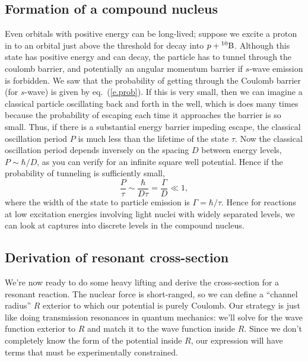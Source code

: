 \subsection{Formation of a compound nucleus}
Even orbitals with positive energy can be long-lived; suppose we excite a proton in \carbon[11] to an orbital just above the threshold for decay into $\pt + \boron[10]$.  Although this state has positive energy and can decay, the particle has to tunnel through the coulomb barrier, and potentially an angular momentum barrier if $s$-wave emission is forbidden.  We saw that the probability of getting through the Coulomb barrier (for $s$-wave) is given by eq.~(\ref{e.prob}).  If this is very small, then we can imagine a classical particle oscillating back and forth in the well, which is does many times because the probability of escaping each time it approaches the barrier is so small. Thus, if there is a substantial energy barrier impeding escape, the classical oscillation period $P$ is much less than the lifetime of the state $\tau$.  Now the classical oscillation period depends inversely on the spacing $D$ between energy levels, $P \sim \hbar/D$, as you can verify for an infinite square well potential.  Hence if the probability of tunneling is sufficiently small,
\[
 \frac{P}{\tau} \sim \frac{\hbar}{D\tau} = \frac{\Gamma}{D} \ll 1,
\]
where the width of the state to particle emission is $\Gamma = \hbar/\tau$.  Hence for reactions at low excitation energies involving light nuclei with widely separated levels, we can look at captures into discrete levels in the compound nucleus. 

\subsection{Derivation of resonant cross-section}\label{s.resonant-cross-section}
We're now ready to do some heavy lifting and derive the cross-section for a resonant reaction.  The nuclear force is short-ranged, so we can define a ``channel radius'' $R$ exterior to which our potential is purely Coulomb. Our strategy is just like doing transmission resonances in quantum mechanics: we'll solve for the wave function exterior to $R$ and match it to the wave function inside $R$.  Since we don't completely know the form of the potential inside $R$, our expression will have terms that must be experimentally constrained.

